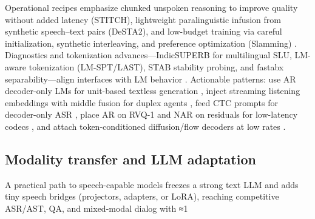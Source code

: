 Operational recipes emphasize chunked unspoken reasoning to improve quality without added latency (STITCH), lightweight paralinguistic infusion from synthetic speech–text pairs (DeSTA2), and low-budget training via careful initialization, synthetic interleaving, and preference optimization (Slamming) \cite{chiang2025stitchsimultaneousthinkingtalkingchunked,lu2025desta2developinginstructionfollowingspee,maimon2025slammingtrainingspeechlanguagemodelonegp}. Diagnostics and tokenization advances—IndicSUPERB for multilingual SLU, LM-aware tokenization (LM-SPT/LAST), STAB stability probing, and fastabx separability—align interfaces with LM behavior \cite{entry2025indicsuperbspeechprocessinguniversalperf,jo2025lmsptalignedsemanticdistillationspeechto,turetzky2024lastlanguagemodelawarespeechtokenization,vashishth2024stabspeechtokenizerassessmentbenchmark,poli2025fastabxlibraryefficientcomputationabxdis}. Actionable patterns: use AR decoder-only LMs for unit-based textless generation \cite{nakata2024jchatjapaneselargescalespokendialoguecor}, inject streaming listening embeddings with middle fusion for duplex agents \cite{ma2024languagemodelcanlistenwhilespeaking}, feed CTC prompts for decoder-only ASR \cite{tsunoo2024decoderonlyarchitecturespeechrecognition}, place AR on RVQ-1 and NAR on residuals for low-latency codecs \cite{min2025speechretrievalaugmentedgenerationwithou,li2024investigatingneuralaudiocodecsspeechlang}, and attach token-conditioned diffusion/flow decoders at low rates \cite{yang2025diffsoundstreamefficientspeechtokenizati,jo2025lmsptalignedsemanticdistillationspeechto,vashishth2024stabspeechtokenizerassessmentbenchmark}.

\subsection{Modality transfer and LLM adaptation} \label{subsec:Modality transfer and LLM adaptation}
A practical path to speech-capable models freezes a strong text LLM and adds tiny speech bridges (projectors, adapters, or LoRA), reaching competitive ASR/AST, QA, and mixed-modal dialog with ≈1%

